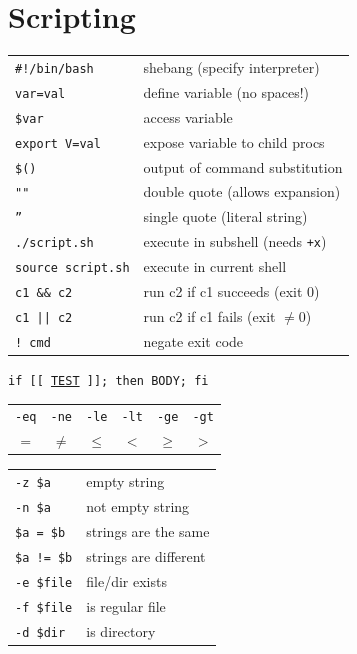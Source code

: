 \documentclass[a4paper, twocolumn]{article}
\renewcommand{\tt}{\texttt}
\begin{document}
\section{Scripting}
\begin{tabular}{ll}
    \verb|#!/bin/bash|  & shebang (specify interpreter)             \\
    \tt{var=val}        & define variable (no spaces!)              \\
    \verb|$var|         & access variable                           \\
    \verb|export V=val| & expose variable to child procs            \\
    \verb|$()|          & output of command substitution            \\
    \tt{""}             & double quote (allows expansion)           \\
    \tt{''}             & single quote (literal string)             \\
    \tt{./script.sh}    & execute in subshell (needs \tt{+x})       \\
    \tt{source script.sh}& execute in current shell                 \\
    \verb|c1 && c2|     & run c2 if c1 succeeds (exit 0)            \\
    \verb!c1 || c2!    & run c2 if c1 fails (exit $\neq 0$)        \\
    \verb|! cmd|        & negate exit code                          
\end{tabular}
\vspace{0.3cm}

\tt{if [[ \underline{TEST} ]]; then BODY; fi}
\vspace{0.3cm}

\begin{tabular}{cccccc}
    \verb|-eq| & \verb|-ne| & \verb|-le| & \verb|-lt| & \verb|-ge| & \verb|-gt| \\
    $=$        & $\neq$     & $\leq$     & $<$        & $\geq$     & $>$
\end{tabular}
\vspace{0.3cm}

\begin{tabular}{ll}
    \verb|-z $a|        & empty string                              \\
    \verb|-n $a|        & not empty string                          \\
    \verb|$a = $b|      & strings are the same                      \\
    \verb|$a != $b|     & strings are different                     \\
    \verb|-e $file|     & file/dir exists                           \\
    \verb|-f $file|     & is regular file                           \\
    \verb|-d $dir|      & is directory
\end{tabular}
\vspace{0.5cm}
\end{document}
